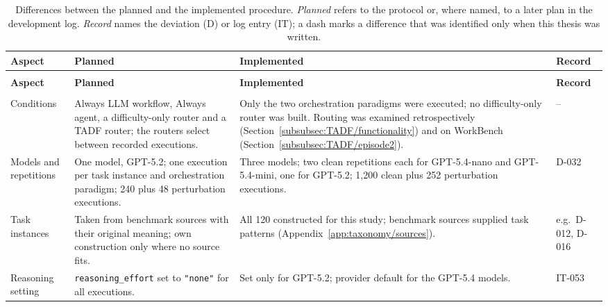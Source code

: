 \begingroup
\renewcommand{\baselinestretch}{1}
\small
\setlength{\tabcolsep}{4pt}
\renewcommand{\arraystretch}{1.08}
\begin{longtable}{>{\raggedright\arraybackslash}p{} >{\raggedright\arraybackslash}p{} >{\raggedright\arraybackslash}p{} >{\raggedright\arraybackslash}p{}}
\caption[Differences between the planned and the implemented procedure]{Differences between the planned and the implemented procedure. \emph{Planned} refers to the protocol or, where named, to a later plan in the development log. \emph{Record} names the deviation (D) or log entry (IT); a dash marks a difference that was identified only when this thesis was written.}\label{tab:app-protocol-changes} \\
\toprule
\textbf{Aspect} & \textbf{Planned} & \textbf{Implemented} & \textbf{Record} \\
\midrule
\endfirsthead
\multicolumn{4}{l}{\tablename~\thetable{} (continued)} \\
\toprule
\textbf{Aspect} & \textbf{Planned} & \textbf{Implemented} & \textbf{Record} \\
\midrule
\endhead
\midrule
\multicolumn{4}{r}{\emph{Continued on the next page.}} \\
\endfoot
\bottomrule
\endlastfoot
Conditions & Always LLM workflow, Always agent, a difficulty-only router and a TADF router; the routers select between recorded executions. & Only the two orchestration paradigms were executed; no difficulty-only router was built. Routing was examined retrospectively (Section~\ref{subsubsec:TADF/functionality}) and on WorkBench (Section~\ref{subsubsec:TADF/episode2}). & -- \\
\addlinespace[2.5pt]
Models and repetitions & One model, GPT-5.2; one execution per task instance and orchestration paradigm; 240 plus 48 perturbation executions. & Three models; two clean repetitions each for GPT-5.4-nano and GPT-5.4-mini, one for GPT-5.2; 1,200 clean plus 252 perturbation executions. & D-032 \\
\addlinespace[2.5pt]
Task instances & Taken from benchmark sources with their original meaning; own construction only where no source fits. & All 120 constructed for this study; benchmark sources supplied task patterns (Appendix~\ref{app:taxonomy/sources}). & e.g.\ D-012, D-016 \\
\addlinespace[2.5pt]
Reasoning setting & \texttt{reasoning\_effort} set to \texttt{"none"} for all executions. & Set only for GPT-5.2; provider default for the GPT-5.4 models. & IT-053 \\

\end{longtable}
